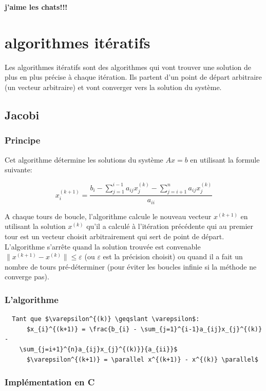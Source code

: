 \documentclass[a4paper]{article}
\begin{document}
\textbf{j'aime les chats!!!}

\section{algorithmes itératifs}

Les algorithmes itératifs sont des algorithmes qui vont trouver une solution de
plus en plus précise à chaque itération. Ils partent d'un point de départ
arbitraire (un vecteur arbitraire) et vont converger vers la solution du
système.

\subsection{Jacobi}

\subsubsection{Principe}

Cet algorithme détermine les solutions du système $Ax = b$ en utilisant la
formule suivante:

\[x_{i}^{(k+1)} = \frac{b_{i} - \sum_{j=1}^{i-1}a_{ij}x_{j}^{(k)} -
  \sum_{j=i+1}^{n}a_{ij}x_{j}^{(k)}}{a_{ii}}\]

A chaque tours de boucle, l'algorithme calcule le nouveau vecteur $x^{(k+1)}$ en
utilisant la solution $x^{(k)}$ qu'il a calculé à l'itération précédente qui au
premier tour est un vecteur choisit arbitrairement qui sert de point de
départ. L'algorithme s'arrête quand la solution trouvée est convenable
$\parallel x^{(k+1)} - x^{(k)} \parallel \leqslant \varepsilon$ (ou
$\varepsilon$ est la précision choisit) ou quand il a fait un nombre de tours
pré-déterminer (pour éviter les boucles infinie si la méthode ne converge pas).

\subsubsection{L'algorithme}

\begin{lstlisting}
  Tant que $\varepsilon^{(k)} \geqslant \varepsilon$:
      $x_{i}^{(k+1)} = \frac{b_{i} - \sum_{j=1}^{i-1}a_{ij}x_{j}^{(k)} -
    \sum_{j=i+1}^{n}a_{ij}x_{j}^{(k)}}{a_{ii}}$
      $\varepsilon^{(k+1)} = \parallel x^{(k+1)} - x^{(k)} \parallel$
\end{lstlisting}

\subsubsection{Implémentation en C}
\end{document}
